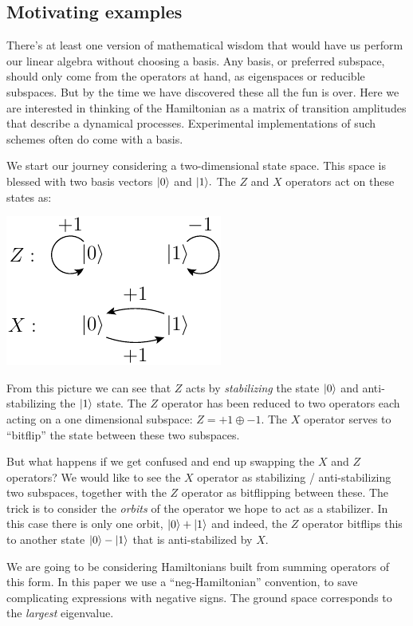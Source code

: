 \documentclass[12pt]{article}
\begin{document}
\subsection{Motivating examples}

There's at least one version of mathematical wisdom that would
have us perform our linear algebra without choosing a basis.
Any basis, or preferred subspace, should only come from the
operators at hand, as eigenspaces or reducible subspaces.
But by the time we have discovered these all the fun is over.
Here we are interested in 
thinking of the Hamiltonian as a matrix of transition
amplitudes that describe a dynamical processes. 
Experimental implementations of such schemes
often do come with a basis.

We start our journey considering a two-dimensional state space.
This space is blessed with two basis vectors $|{0}\rangle$ and $|{1}\rangle.$
The $Z$ and $X$ operators act on these states as:
\begin{center}
\includegraphics[]{pic-zx.pdf}
\end{center}
From this picture we can see that $Z$ acts by \emph{stabilizing} the
state $|{0}\rangle$ and anti-stabilizing the $|{1}\rangle$ state.
The $Z$ operator has been reduced 
to two operators each acting on a one dimensional subspace:
$Z = +1 \oplus -1.$
The $X$ operator serves to ``bitflip'' the state between
these two subspaces.

But what happens if we get confused and end up swapping
the $X$ and $Z$ operators? We would like to see the $X$ operator
as stabilizing / anti-stabilizing two subspaces, together with the
$Z$ operator as bitflipping between these.
The trick is to consider the \emph{orbits} of the operator
we hope to act as a stabilizer.
In this case there is only one orbit, $|{0}\rangle+|{1}\rangle$
and indeed, the $Z$ operator bitflips this to another state
$|{0}\rangle-|{1}\rangle$ that is anti-stabilized by $X.$

We are going to be considering Hamiltonians built from
summing operators of this form.
In this paper we use a ``neg-Hamiltonian'' convention,
to save complicating expressions with negative signs.
The ground space corresponds to the \emph{largest} eigenvalue.
\end{document}

